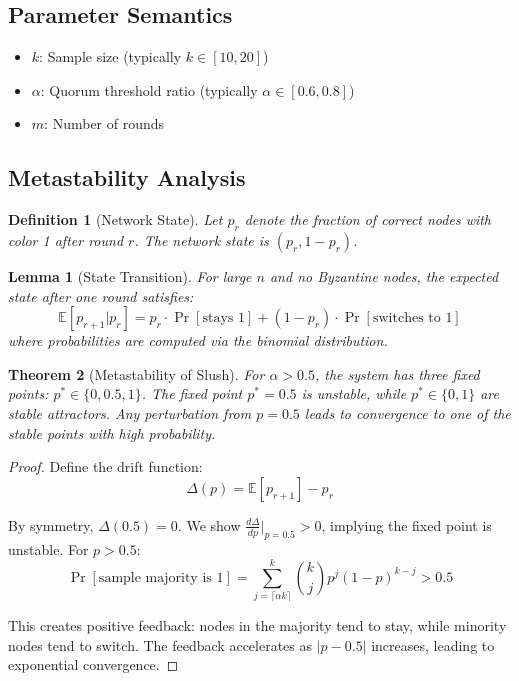\documentclass[11pt,a4paper]{article}
\newtheorem{theorem}{Theorem}
\newtheorem{lemma}[theorem]{Lemma}
\newtheorem{definition}{Definition}
\begin{document}
\subsection{Parameter Semantics}

\begin{itemize}
    \item $k$: Sample size (typically $k \in [10, 20]$)
    \item $\alpha$: Quorum threshold ratio (typically $\alpha \in [0.6, 0.8]$)
    \item $m$: Number of rounds
\end{itemize}

\subsection{Metastability Analysis}

\begin{definition}[Network State]
Let $p_r$ denote the fraction of correct nodes with color 1 after round $r$. The network state is $(p_r, 1-p_r)$.
\end{definition}

\begin{lemma}[State Transition]
\label{lem:slush-transition}
For large $n$ and no Byzantine nodes, the expected state after one round satisfies:
\begin{equation}
\mathbb{E}[p_{r+1} | p_r] = p_r \cdot \Pr[\text{stays 1}] + (1-p_r) \cdot \Pr[\text{switches to 1}]
\end{equation}
where probabilities are computed via the binomial distribution.
\end{lemma}

\begin{theorem}[Metastability of Slush]
\label{thm:slush-meta}
For $\alpha > 0.5$, the system has three fixed points: $p^* \in \{0, 0.5, 1\}$. The fixed point $p^* = 0.5$ is unstable, while $p^* \in \{0, 1\}$ are stable attractors. Any perturbation from $p = 0.5$ leads to convergence to one of the stable points with high probability.
\end{theorem}

\begin{proof}
Define the drift function:
\begin{equation}
\Delta(p) = \mathbb{E}[p_{r+1}] - p_r
\end{equation}

By symmetry, $\Delta(0.5) = 0$. We show $\frac{d\Delta}{dp}\big|_{p=0.5} > 0$, implying the fixed point is unstable. For $p > 0.5$:
\begin{equation}
\Pr[\text{sample majority is 1}] = \sum_{j=\lceil \alpha k \rceil}^{k} \binom{k}{j} p^j (1-p)^{k-j} > 0.5
\end{equation}

This creates positive feedback: nodes in the majority tend to stay, while minority nodes tend to switch. The feedback accelerates as $|p - 0.5|$ increases, leading to exponential convergence.
\end{proof}
\end{document}

